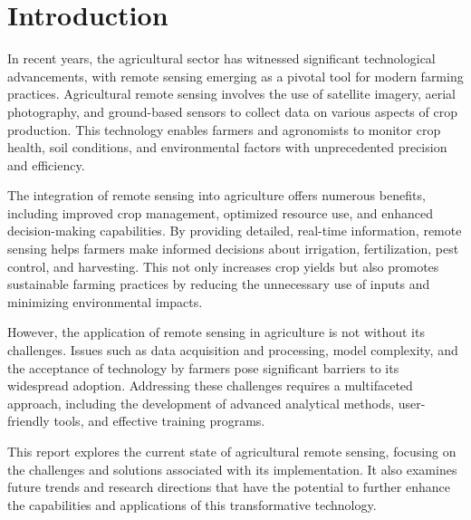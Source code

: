 \section{Introduction}

In recent years, the agricultural sector has witnessed significant technological advancements, with remote sensing emerging as a pivotal tool for modern farming practices. Agricultural remote sensing involves the use of satellite imagery, aerial photography, and ground-based sensors to collect data on various aspects of crop production\cite{bastiaanssenRemoteSensingIrrigated2000}\cite{geRemoteSensingSoil2011}\cite{huangAgriculturalRemoteSensing2018}\cite{javedPerformanceRelationshipFour2021}. This technology enables farmers and agronomists to monitor crop health, soil conditions, and environmental factors with unprecedented precision and efficiency.

The integration of remote sensing into agriculture offers numerous benefits, including improved crop management, optimized resource use, and enhanced decision-making capabilities\cite{javedPerformanceRelationshipFour2021}. By providing detailed, real-time information, remote sensing helps farmers make informed decisions about irrigation, fertilization, pest control, and harvesting. This not only increases crop yields but also promotes sustainable farming practices by reducing the unnecessary use of inputs and minimizing environmental impacts.

However, the application of remote sensing in agriculture is not without its challenges\cite{ozdoganRemoteSensingIrrigated2010}. Issues such as data acquisition and processing, model complexity, and the acceptance of technology by farmers pose significant barriers to its widespread adoption. Addressing these challenges requires a multifaceted approach, including the development of advanced analytical methods, user-friendly tools, and effective training programs.

This report explores the current state of agricultural remote sensing, focusing on the challenges and solutions associated with its implementation. It also examines future trends and research directions that have the potential to further enhance the capabilities and applications of this transformative technology.